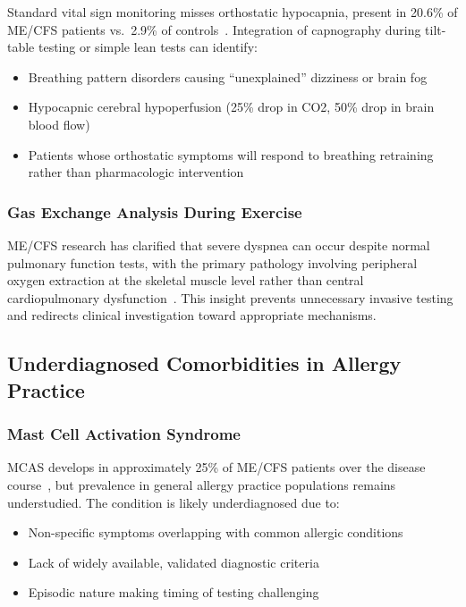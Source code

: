 Standard vital sign monitoring misses orthostatic hypocapnia, present in 20.6\% of ME/CFS patients vs.\ 2.9\% of controls~\cite{Natelson2022}. Integration of capnography during tilt-table testing or simple lean tests can identify:

\begin{itemize}
    \item Breathing pattern disorders causing ``unexplained'' dizziness or brain fog
    \item Hypocapnic cerebral hypoperfusion (25\% drop in CO2, 50\% drop in brain blood flow)
    \item Patients whose orthostatic symptoms will respond to breathing retraining rather than pharmacologic intervention
\end{itemize}

\subsubsection{Gas Exchange Analysis During Exercise}

ME/CFS research has clarified that severe dyspnea can occur despite normal pulmonary function tests, with the primary pathology involving peripheral oxygen extraction at the skeletal muscle level rather than central cardiopulmonary dysfunction~\cite{Joseph2023}. This insight prevents unnecessary invasive testing and redirects clinical investigation toward appropriate mechanisms.

\subsection{Underdiagnosed Comorbidities in Allergy Practice}

\subsubsection{Mast Cell Activation Syndrome}

MCAS develops in approximately 25\% of ME/CFS patients over the disease course~\cite{Wirth2023}, but prevalence in general allergy practice populations remains understudied. The condition is likely underdiagnosed due to:

\begin{itemize}
    \item Non-specific symptoms overlapping with common allergic conditions
    \item Lack of widely available, validated diagnostic criteria
    \item Episodic nature making timing of testing challenging
\end{itemize}

